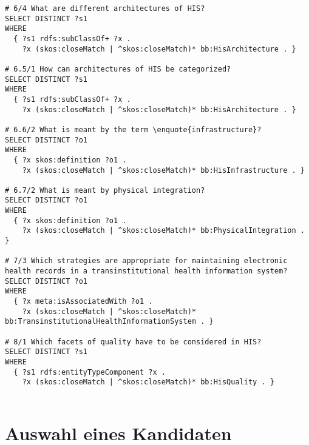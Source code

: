\begin{lstlisting}[language=SPARQL]
# 6/4 What are different architectures of HIS?
SELECT DISTINCT ?s1
WHERE
  { ?s1 rdfs:subClassOf+ ?x .
    ?x (skos:closeMatch | ^skos:closeMatch)* bb:HisArchitecture . }

# 6.5/1 How can architectures of HIS be categorized?
SELECT DISTINCT ?s1
WHERE
  { ?s1 rdfs:subClassOf+ ?x .
    ?x (skos:closeMatch | ^skos:closeMatch)* bb:HisArchitecture . }

# 6.6/2 What is meant by the term \enquote{infrastructure}?
SELECT DISTINCT ?o1
WHERE
  { ?x skos:definition ?o1 .
    ?x (skos:closeMatch | ^skos:closeMatch)* bb:HisInfrastructure . }

# 6.7/2 What is meant by physical integration?
SELECT DISTINCT ?o1
WHERE
  { ?x skos:definition ?o1 .
    ?x (skos:closeMatch | ^skos:closeMatch)* bb:PhysicalIntegration . }

# 7/3 Which strategies are appropriate for maintaining electronic health records in a transinstitutional health information system?
SELECT DISTINCT ?o1
WHERE
  { ?x meta:isAssociatedWith ?o1 .
    ?x (skos:closeMatch | ^skos:closeMatch)* bb:TransinstitutionalHealthInformationSystem . }

# 8/1 Which facets of quality have to be considered in HIS?
SELECT DISTINCT ?s1
WHERE
  { ?s1 rdfs:entityTypeComponent ?x .
    ?x (skos:closeMatch | ^skos:closeMatch)* bb:HisQuality . }


\end{lstlisting}

\section{Auswahl eines Kandidaten}

